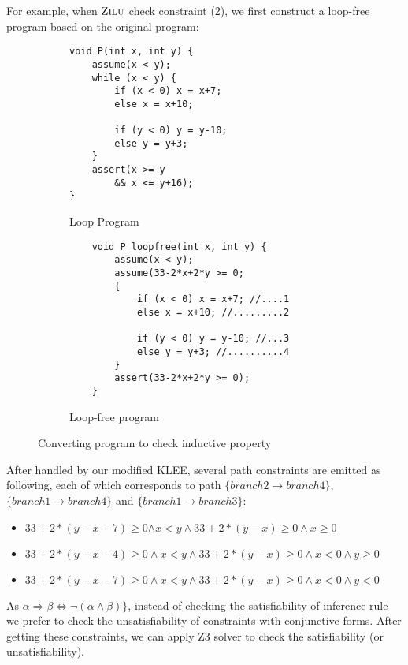 For example, when $\textsc{Zilu}$ check constraint (2), 
we first construct a loop-free program based on the original program:
\begin{figure}[!h]
\begin{subfigure}{0.20\textwidth}
    \centering
    {\scriptsize\begin{verbatim}
void P(int x, int y) {
    assume(x < y);
    while (x < y) {
        if (x < 0) x = x+7;
        else x = x+10;
    
        if (y < 0) y = y-10;
        else y = y+3; 
    }
    assert(x >= y
        && x <= y+16);
}
    \end{verbatim}}
    \vspace{-5mm}
    \caption{Loop Program}
    \label{fig:running:example:program}
\end{subfigure}%
\begin{subfigure}{.20\textwidth}
      \centering
      \vspace{-0.1cm}
        {\scriptsize\begin{verbatim}
    void P_loopfree(int x, int y) {
        assume(x < y);
        assume(33-2*x+2*y >= 0;
        {
            if (x < 0) x = x+7; //....1
            else x = x+10; //.........2
    
            if (y < 0) y = y-10; //...3
            else y = y+3; //..........4
        }
        assert(33-2*x+2*y >= 0);
    }
    \end{verbatim}}
    \vspace{-5mm}
    \caption{Loop-free program}
      \label{fig:running:example:verification}
\end{subfigure}
\caption{Converting program to check inductive property}
\label{fig:running:example}
\end{figure}

After handled by our modified KLEE,
several path constraints are emitted as following, each of which corresponds to path 
$\{branch2 \to branch4\}$, $\{branch1 \to branch4\}$ and $\{branch1 \to branch3\}$:


\begin{itemize}
\item $33+2*(y-x-7)\ge0 \mathbf{\wedge} x<y \wedge 33+2*(y-x)\ge0 \wedge x\ge0$
\item $33+2*(y-x-4)\ge0 \wedge x<y \wedge 33+2*(y-x)\ge0 \wedge x<0 \wedge y\ge0$
\item $33+2*(y-x-7)\ge0 \wedge x<y \wedge 33+2*(y-x)\ge0 \wedge x<0 \wedge y<0$
\end{itemize}
As $\alpha \Rightarrow \beta \Longleftrightarrow \neg (\alpha \wedge \beta)\}$, 
instead of checking the satisfiability of inference rule
we prefer to check the unsatisfiability of constraints with conjunctive forms. 
After getting these constraints, we can apply Z3 solver to check the satisfiability (or unsatisfiability).


